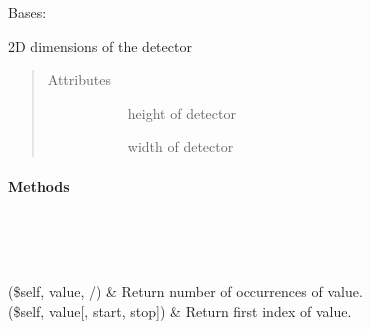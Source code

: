 \documentclass[letterpaper,10pt,english]{sphinxmanual}
\begin{document}
\begin{fulllineitems}
\label{\detokenize{dataTypes:dataTypes.DetectorVolume}}
Bases: 

2D dimensions of the detector
\begin{quote}\begin{description}
\item[{Attributes}] \leavevmode\begin{description}
\item[{{\hyperref[\detokenize{dataTypes:dataTypes.DetectorVolume.height}]{}}}] \leavevmode
height of detector

\item[{{\hyperref[\detokenize{dataTypes:dataTypes.DetectorVolume.width}]{}}}] \leavevmode
width of detector

\end{description}

\end{description}\end{quote}
\paragraph{Methods}


\begin{savenotes}\sphinxatlongtablestart\begin{longtable}{}
\hline

\endfirsthead

%
{}\\
\hline

\endhead

\hline
{}\\
\endfoot

\endlastfoot

(\$self, value, /)
&
Return number of occurrences of value.
\\
\hline
{}(\$self, value{[}, start, stop{]})
&
Return first index of value.
\\
\hline
\end{longtable}\sphinxatlongtableend\end{savenotes}


\end{fulllineitems}
\end{document}

